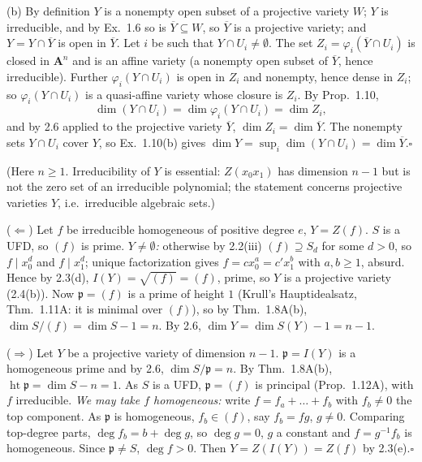 \documentclass[11pt]{article}
\begin{document}
(b) By definition $Y$ is a nonempty open subset of a projective variety $W$; $Y$ is irreducible, and by Ex.~1.6 so is $\overline Y\subseteq W$, so $\overline Y$ is a projective variety; and $Y=Y\cap\overline Y$ is open in $\overline Y$. Let $i$ be such that $Y\cap U_i\ne\emptyset$. The set $Z_i=\varphi_i(\overline Y\cap U_i)$ is closed in $\mathbf A^n$ and is an affine variety (a nonempty open subset of $\overline Y$, hence irreducible). Further $\varphi_i(Y\cap U_i)$ is open in $Z_i$ and nonempty, hence dense in $Z_i$; so $\varphi_i(Y\cap U_i)$ is a quasi-affine variety whose closure is $Z_i$. By Prop.~1.10,
\[\dim (Y\cap U_i)=\dim\varphi_i(Y\cap U_i)=\dim Z_i,\]
and by 2.6 applied to the projective variety $\overline Y$, $\dim Z_i=\dim\overline Y$. The nonempty sets $Y\cap U_i$ cover $Y$, so Ex.~1.10(b) gives $\dim Y=\sup_i\dim(Y\cap U_i)=\dim\overline Y$.\hfill$\square$

\pf
(Here $n\ge1$. Irreducibility of $Y$ is essential: $Z(x_0x_1)$ has dimension $n-1$ but is not the zero set of an irreducible polynomial; the statement concerns projective varieties $Y$, i.e.\ irreducible algebraic sets.)

($\Leftarrow$) Let $f$ be irreducible homogeneous of positive degree $e$, $Y=Z(f)$. $S$ is a UFD, so $(f)$ is prime. \emph{$Y\ne\emptyset$:} otherwise by 2.2(iii) $(f)\supseteq S_d$ for some $d>0$, so $f\mid x_0^d$ and $f\mid x_1^d$; unique factorization gives $f=cx_0^a=c'x_1^b$ with $a,b\ge1$, absurd. Hence by 2.3(d), $I(Y)=\sqrt{(f)}=(f)$, prime, so $Y$ is a projective variety (2.4(b)). Now $\mathfrak p=(f)$ is a prime of height $1$ (Krull's Hauptidealsatz, Thm.~1.11A: it is minimal over $(f)$), so by Thm.~1.8A(b), $\dim S/(f)=\dim S-1=n$. By 2.6, $\dim Y=\dim S(Y)-1=n-1$.

($\Rightarrow$) Let $Y$ be a projective variety of dimension $n-1$. $\mathfrak p=I(Y)$ is a homogeneous prime and by 2.6, $\dim S/\mathfrak p=n$. By Thm.~1.8A(b), $\operatorname{ht}\mathfrak p=\dim S-n=1$. As $S$ is a UFD, $\mathfrak p=(f)$ is principal (Prop.~1.12A), with $f$ irreducible. \emph{We may take $f$ homogeneous:} write $f=f_a+\dots+f_b$ with $f_b\ne0$ the top component. As $\mathfrak p$ is homogeneous, $f_b\in(f)$, say $f_b=fg$, $g\neq0$. Comparing top-degree parts, $\deg f_b=b+\deg g$, so $\deg g=0$, $g$ a constant and $f=g^{-1}f_b$ is homogeneous. Since $\mathfrak p\ne S$, $\deg f>0$. Then $Y=Z(I(Y))=Z(f)$ by 2.3(e).\hfill$\square$
\end{document}
